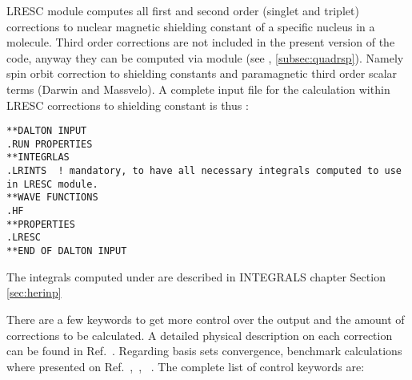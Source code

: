 \begin{center}
\end{center}

LRESC module computes all first and second order (singlet and triplet) corrections to nuclear magnetic shielding constant of a specific nucleus in a molecule. 
Third order corrections are not included in the present version of the code, anyway they can be computed via  module (see , \ref{subsec:quadrsp}). Namely spin orbit correction to shielding constants and paramagnetic third order scalar terms (Darwin and Massvelo). A complete input file for the calculation within LRESC corrections to shielding constant is thus :

\begin{verbatim}
**DALTON INPUT
.RUN PROPERTIES
**INTEGRLAS 
.LRINTS  ! mandatory, to have all necessary integrals computed to use in LRESC module.
**WAVE FUNCTIONS
.HF
**PROPERTIES
.LRESC
**END OF DALTON INPUT
\end{verbatim}

The integrals computed under  are described in INTEGRALS chapter Section \ref{sec:herinp}

There are a few keywords to get more control over the output and the amount of corrections to be calculated. A detailed physical description on each correction can be found in Ref.~\cite{melomaldojcp12}. Regarding basis sets convergence, benchmark calculations where presented on Ref.~\cite{melomaldojcp12},~\cite{melomaldotca11},~\cite{melojcp03} . The complete list of control keywords are:

